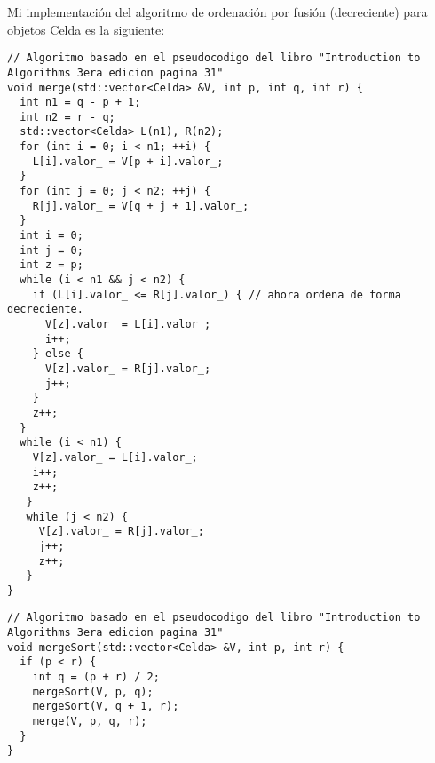 Mi implementación del algoritmo de ordenación por fusión (decreciente) para objetos Celda es la siguiente:
\begin{lstlisting}
// Algoritmo basado en el pseudocodigo del libro "Introduction to Algorithms 3era edicion pagina 31"
void merge(std::vector<Celda> &V, int p, int q, int r) {
  int n1 = q - p + 1;
  int n2 = r - q;
  std::vector<Celda> L(n1), R(n2);
  for (int i = 0; i < n1; ++i) {
    L[i].valor_ = V[p + i].valor_;
  }
  for (int j = 0; j < n2; ++j) {
    R[j].valor_ = V[q + j + 1].valor_;
  }
  int i = 0;
  int j = 0;
  int z = p;
  while (i < n1 && j < n2) {
    if (L[i].valor_ <= R[j].valor_) { // ahora ordena de forma decreciente.
      V[z].valor_ = L[i].valor_;
      i++;
    } else {
      V[z].valor_ = R[j].valor_;
      j++;
    }
    z++;
  }
  while (i < n1) {
    V[z].valor_ = L[i].valor_;
    i++;
    z++;
   }
   while (j < n2) {
     V[z].valor_ = R[j].valor_;
     j++;
     z++;
   }
}
\end{lstlisting}

\begin{lstlisting}
// Algoritmo basado en el pseudocodigo del libro "Introduction to Algorithms 3era edicion pagina 31"
void mergeSort(std::vector<Celda> &V, int p, int r) {
  if (p < r) {
    int q = (p + r) / 2;
    mergeSort(V, p, q);
    mergeSort(V, q + 1, r);
    merge(V, p, q, r);
  }
}
\end{lstlisting}